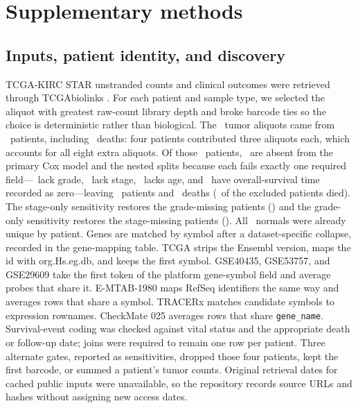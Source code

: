\section{Supplementary methods}
\subsection{Inputs, patient identity, and discovery}
TCGA-KIRC STAR unstranded counts and clinical outcomes were retrieved through TCGAbiolinks \cite{colaprico_tcgabiolinks_2016}. For each patient and sample type, we selected the aliquot with greatest raw-count library depth and broke barcode ties so the choice is deterministic rather than biological. The \OriginalTumorSamples\ tumor aliquots came from \TumorPatients\ patients, including \TcgaTumorEvents\ deaths: four patients contributed three aliquots each, which accounts for all eight extra aliquots. Of those \TumorPatients\ patients, \NestedExcluded\ are absent from the primary Cox model and the nested splits because each fails exactly one required field---\ExcludeGrade\ lack grade, \ExcludeStage\ lack stage, \ExcludeAge\ lacks age, and \ExcludeTime\ have overall-survival time recorded as zero---leaving \NestedPatients\ patients and \NestedEvents\ deaths (\ExcludeDeaths\ of the excluded patients died). The stage-only sensitivity restores the grade-missing patients (\StageOnlyPatients) and the grade-only sensitivity restores the stage-missing patients (\GradeOnlyPatients). All \NormalPatients\ normals were already unique by patient. Genes are matched by symbol after a dataset-specific collapse, recorded in the gene-mapping table. TCGA strips the Ensembl version, maps the id with org.Hs.eg.db, and keeps the first symbol. GSE40435, GSE53757, and GSE29609 take the first token of the platform gene-symbol field and average probes that share it. E-MTAB-1980 maps RefSeq identifiers the same way and averages rows that share a symbol. TRACERx matches candidate symbols to expression rownames. CheckMate 025 averages rows that share \texttt{gene\_name}. Survival-event coding was checked against vital status and the appropriate death or follow-up date; joins were required to remain one row per patient. Three alternate gates, reported as sensitivities, dropped those four patients, kept the first barcode, or summed a patient's tumor counts. Original retrieval dates for cached public inputs were unavailable, so the repository records source URLs and hashes without assigning new access dates.

